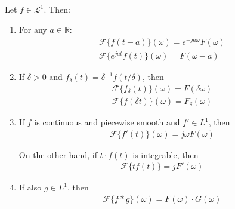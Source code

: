 \begin{theorem} \label{theorem:fund_sym_Fourier}
Let $f \in \mathcal{L}^1$. Then:

\begin{enumerate}[label=(\alph*)]
\item For any $a \in \mathbb{R}$:
\begin{align*}
\mathcal{F}\{f(t-a)\}(\omega) = e^{-ja\omega} F(\omega) \\
\mathcal{F}\{e^{jat}f(t)\}(\omega) = F(\omega - a)
\end{align*}

\item If $\delta > 0$ and $f_\delta(t)=\delta^{-1}f(t/\delta)$, then
\begin{align*}
\mathcal{F}\{f_\delta(t)\}(\omega) = F(\delta\omega) \\
\mathcal{F}\{f(\delta t)\}(\omega) = F_\delta(\omega)
\end{align*}

\item If $f$ is continuous and piecewise smooth and $f' \in L^1$, then
\begin{align*}
\mathcal{F}\{f'(t)\}(\omega) = j\omega F(\omega)
\end{align*}

On the other hand, if $t\cdot f(t)$ is integrable, then
\begin{align*}
\mathcal{F}\{tf(t)\} = j F'(\omega)
\end{align*}

\item If also $g \in L^1$, then
\begin{align*}
\mathcal{F}\{f*g\}(\omega) = F(\omega) \cdot G(\omega)
\end{align*}
\end{enumerate}
\end{theorem}

